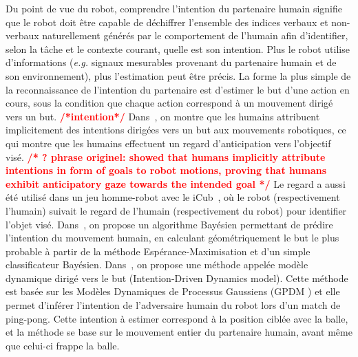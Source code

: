 \documentclass[utf8]{frontiersSCNS} %
\newcommand{\todo}[1]{\textcolor{red}{\textbf{/*#1*/}}}
\begin{document}



Du point de vue du robot, comprendre l'intention du partenaire humain signifie que le robot doit être capable de déchiffrer l'ensemble des indices verbaux et non-verbaux naturellement générés par le comportement de l'humain afin d'identifier, selon la tâche et le contexte courant, quelle est son intention.
Plus le robot utilise d'informations (\textit{e.g.} signaux mesurables provenant du partenaire humain et de son environnement), plus l'estimation peut être précis.
La forme la plus simple de la reconnaissance de l’intention du partenaire est d'estimer le but d'une action en cours, sous la condition que chaque action correspond à un mouvement dirigé vers un but. \todo{intention}
Dans~\cite{sciutti2013robots}, on montre que les humains attribuent implicitement des intentions dirigées vers un but aux mouvements robotiques, ce qui montre que les humains effectuent un regard d'anticipation vers l'objectif visé. \todo{ ? phrase originel: showed that humans implicitly attribute intentions in form of goals to robot motions, proving that humans exhibit anticipatory gaze towards the intended goal }   
Le regard a aussi été utilisé dans un jeu homme-robot avec le iCub~\cite{Ivaldi2014}, où le robot (respectivement l'humain) suivait le regard de l'humain (respectivement du robot) pour identifier l'objet visé.
Dans~\cite{ferrer2014bayesian}, on propose un algorithme Bayésien permettant de prédire l’intention du mouvement humain, en calculant géométriquement le but le plus probable à partir de la méthode Espérance-Maximisation et d'un simple classificateur Bayésien.
Dans~\citep{wang2012probabilistic}, on propose une méthode appelée modèle dynamique dirigé vers le but (Intention-Driven Dynamics model). Cette méthode est basée sur les Modèles Dynamiques de Processus Gaussiens (GPDM \citep{wang2005gaussian}) et elle permet d'inférer l'intention de l'adversaire humain du robot lors d'un match de ping-pong. Cette intention à estimer correspond à la position ciblée avec la balle, et la méthode se base sur le mouvement entier du partenaire humain, avant même que celui-ci frappe la balle.
\end{document}
